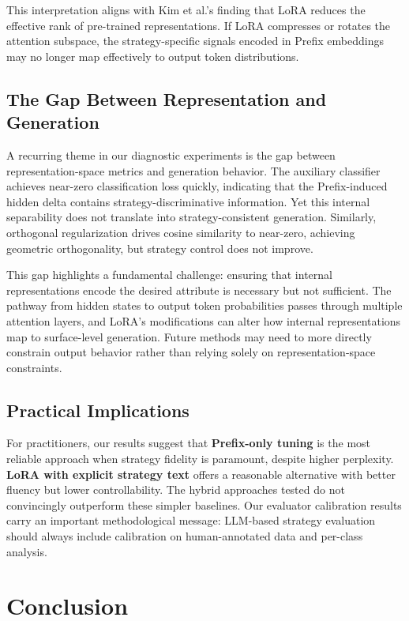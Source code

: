\documentclass[conference]{IEEEtran}
\begin{document}
This interpretation aligns with Kim et al.'s finding that LoRA reduces the effective rank of pre-trained representations. If LoRA compresses or rotates the attention subspace, the strategy-specific signals encoded in Prefix embeddings may no longer map effectively to output token distributions.

\subsection{The Gap Between Representation and Generation}

A recurring theme in our diagnostic experiments is the gap between representation-space metrics and generation behavior. The auxiliary classifier achieves near-zero classification loss quickly, indicating that the Prefix-induced hidden delta contains strategy-discriminative information. Yet this internal separability does not translate into strategy-consistent generation. Similarly, orthogonal regularization drives cosine similarity to near-zero, achieving geometric orthogonality, but strategy control does not improve.

This gap highlights a fundamental challenge: ensuring that internal representations encode the desired attribute is necessary but not sufficient. The pathway from hidden states to output token probabilities passes through multiple attention layers, and LoRA's modifications can alter how internal representations map to surface-level generation. Future methods may need to more directly constrain output behavior rather than relying solely on representation-space constraints.

\subsection{Practical Implications}

For practitioners, our results suggest that \textbf{Prefix-only tuning} is the most reliable approach when strategy fidelity is paramount, despite higher perplexity. \textbf{LoRA with explicit strategy text} offers a reasonable alternative with better fluency but lower controllability. The hybrid approaches tested do not convincingly outperform these simpler baselines. Our evaluator calibration results carry an important methodological message: LLM-based strategy evaluation should always include calibration on human-annotated data and per-class analysis.

\section{Conclusion}
\end{document}
